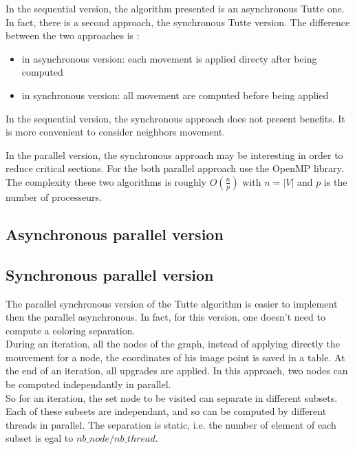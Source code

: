 

In the sequential version, the algorithm presented is an asynchronous Tutte one. In fact, there is a second approach, the synchronous Tutte version. The difference between the two approaches is :
\begin{itemize}
\item in asynchronous version: each movement is applied directy after being computed
\item in synchronous version: all movement are computed before being applied
\end{itemize}
In the sequential version, the synchronous approach does not present
benefits. It is more convenient to consider neighbors movement.

In the parallel version, the synchronous approach may be interesting in
order to reduce critical sections. For the both parallel approach use the
OpenMP library.
\\
The complexity these two algorithms is roughly $\mathit{O(\frac{n}{p})}$
with $n = |V|$ and $p$ is the number of processeurs.
\\

\subsection{Asynchronous parallel version}


\subsection{Synchronous parallel version}

The parallel synchronous version of the Tutte algorithm is easier to
implement then the parallel asynchronous. In fact, for this version, one
doesn't need to compute a coloring separation.
\\

During an iteration, all the nodes of the graph, instead of applying
directly the mouvement for a node, the coordinates of his image point is
saved in a table. At the end of an iteration, all upgrades are applied. In
this approach, two nodes can be computed independantly in parallel. 
\\

So for an iteration, the set node to be visited can separate in different
subsets. Each of these subsets are independant, and so can be computed by
different threads in parallel. The separation is static, i.e. the number of
element of each subset is egal to $nb\_node / nb\_thread$.

